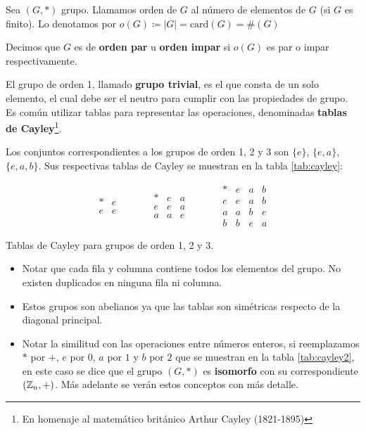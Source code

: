 \begin{fmd-definition} 
	Sea $(G, *)$ grupo. Llamamos orden de $G$ al número de elementos de $G$ (si $G$ es finito). Lo denotamos por $o(G) \coloneqq |G| = \mbox{card} (G) = \# (G)$
\end{fmd-definition}

Decimos que $G$ es de \textbf{orden par} u \textbf{orden impar} si $o(G)$ es par o impar respectivamente.

El grupo de orden 1, llamado \textbf{grupo trivial}, es el que consta de un solo elemento, el cual debe ser el neutro para cumplir con las propiedades de grupo. Es común utilizar tablas para representar las operaciones, denominadas \textbf{tablas de Cayley}\footnote{En homenaje al matemático británico Arthur Cayley (1821-1895)}. 

Los conjuntos correspondientes a los grupos de orden 1, 2 y 3 son $\{ e \}$, $\{ e, a \}$, $\{e, a, b\}$. Sus respectivas tablas de Cayley se muestran en la tabla \ref{tab:cayley}:

\begin{table}[H]
	\centering
	\[ \begin{array}{c|c}
		* & e \\ \hline
		e & e
	\end{array} \qquad \quad \begin{array}{c|cc}
		* & e & a \\ \hline
		e & e & a \\
		a & a & e
	\end{array} \qquad \quad \begin{array}{c|ccc}
		* & e & a & b \\ \hline
		e & e & a & b \\
		a & a & b & e \\
		b & b & e & a
	\end{array}\]
	\caption{Tablas de Cayley para grupos de orden 1, 2 y 3.}
	\label{tab:cayley}
\end{table}
\begin{itemize}
	\item Notar que cada fila y columna contiene todos los elementos del grupo. No existen duplicados en ninguna fila ni columna.
	
	\item Estos grupos son abelianos ya que las tablas son simétricas respecto de la diagonal principal.
	\item Notar la similitud con las operaciones entre números enteros, si reemplazamos $*$ por $+$, $e$ por $0$, $a$ por $1$ y $b$ por $2$ que se muestran en la tabla \ref{tab:cayley2}, en este caso se dice que el grupo $(G, *)$ es \textbf{isomorfo} con su correspondiente $(\mathbb{Z}_n, +)$. Más adelante se verán estos conceptos con más detalle.
\end{itemize}

